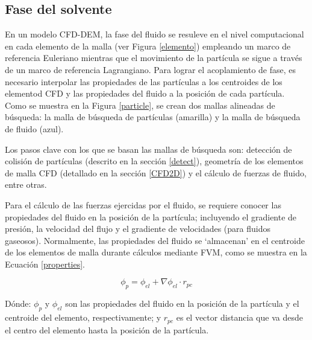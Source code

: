 \subsection{Fase del solvente}

\noindent
\justify

En un modelo CFD-DEM, la fase del fluido se resuleve en el nivel computacional en cada elemento de la malla (ver Figura \ref{elemento}) empleando un marco de referencia Euleriano mientras que el movimiento de la part\'icula se sigue a trav\'es de un marco de referencia Lagrangiano. Para lograr el acoplamiento de fase, es necesario interpolar las propiedades de las part\'iculas a los centroides de los elementod CFD y las propiedades del fluido a la posici\'on de cada part\'icula. Como se muestra en la Figura \ref{particle}, se crean dos mallas alineadas de b\'usqueda: la malla de b\'usqueda de part\'iculas (amarilla) y la malla de b\'usqueda de fluido (azul). 



\noindent
\justify

Los pasos clave con los que se basan las mallas de b\'usqueda son: detecci\'on de colisi\'on de part\'iculas (descrito en la secci\'on \ref{detect}), geometr\'ia de los elementos de malla CFD (detallado en la secci\'on \ref{CFD2D}) y el c\'alculo de fuerzas de fluido, entre otras.

\noindent
\justify

Para el c\'alculo de las fuerzas ejercidas por el fluido, se requiere conocer las propiedades del fluido en la posici\'on de la part\'icula; incluyendo el gradiente de presi\'on, la velocidad del flujo y el gradiente de velocidades (para fluidos gaseosos). Normalmente, las propiedades del fluido se `almacenan' en el centroide de los elementos de malla durante c\'alculos mediante FVM, como se muestra en la Ecuaci\'on \ref{properties}.

\begin{equation}
\phi _p = \phi _{el} + \nabla \phi _{el} \cdot r_{pc}
\label{properties}
\end{equation}

\noindent
\justify

D\'onde: $\phi _p$ y $\phi _{el}$ son las propiedades del fluido en la posici\'on de la part\'icula y el centroide del elemento, respectivamente; y $r_{pc}$ es el vector distancia que va desde el centro del elemento hasta la posici\'on de la part\'icula. 